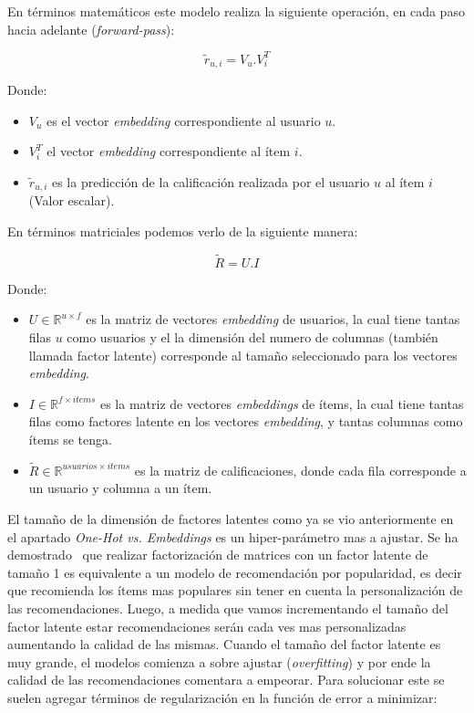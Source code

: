 \documentclass[11pt,a4paper,twoside]{thesis}
\begin{document}
\clearpage

En términos matemáticos este modelo realiza la siguiente operación, en cada
paso hacia adelante (\textit{forward-pass}):

\begin{equation}
	\tilde{r}_{u, i} = V_u . V_i^{T}
\end{equation}
\begin{description}
	\item[Donde:]
\end{description}
\begin{itemize}
	\item $V_u$ es el vector \textit{embedding} correspondiente al usuario $u$.
	\item $V_i^{T}$ el vector \textit{embedding} correspondiente al ítem $i$.
	\item $ \tilde{r}_{u, i}$ es la predicción de la calificación realizada por el usuario $u$ al ítem $i$ (Valor escalar).
\end{itemize}

En términos matriciales podemos verlo de la siguiente manera:

\begin{equation}
	\tilde{R} = U.I
\end{equation}
\begin{description}
	\item[Donde:]
\end{description}
\begin{itemize}
	\item $U\in\mathbb{R}^{u \times f}$ es la matriz de vectores \textit{embedding} de usuarios, la cual tiene tantas filas $u$ como usuarios y el la dimensión del numero de columnas (también llamada factor latente) corresponde al tamaño seleccionado para los vectores \textit{embedding}.
	\item $I\in\mathbb{R}^{f\times items}$ es la matriz de vectores \textit{embeddings} de ítems, la cual tiene tantas filas como factores latente en los vectores \textit{embedding}, y tantas columnas como ítems se tenga.
	\item $\tilde{R}\in\mathbb{R}^{usuarios \times items}$ es la matriz de calificaciones, donde cada fila corresponde a un usuario y columna a un ítem.
\end{itemize}

El tamaño de la dimensión de factores latentes como ya se vio anteriormente en
el apartado \textit{One-Hot vs. Embeddings} es un hiper-parámetro mas a
ajustar. Se ha demostrado~\cite{embeddingsizedem} que realizar factorización de
matrices con un factor latente de tamaño 1 es equivalente a un modelo de
recomendación por popularidad, es decir que recomienda los ítems mas populares
sin tener en cuenta la personalización de las recomendaciones. Luego, a medida
que vamos incrementando el tamaño del factor latente estar recomendaciones
serán cada ves mas personalizadas aumentando la calidad de las mismas. Cuando
el tamaño del factor latente es muy grande, el modelos comienza a sobre ajustar
(\textit{overfitting}) y por ende la calidad de las recomendaciones comentara a
empeorar. Para solucionar este se suelen agregar términos de regularización en
la función de error a minimizar:
\end{document}
